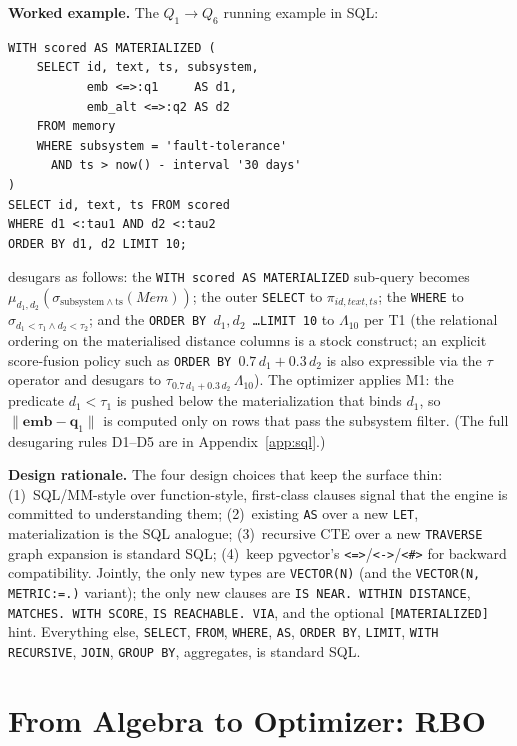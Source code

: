 \documentclass[sigconf]{acmart}
\theoremstyle{plain}
\theoremstyle{definition}
\newcommand{\vect}[1]{\boldsymbol{#1}}
\newcommand{\Mem}{\mathit{Mem}}
\theoremstyle{remark}
\begin{document}
\textbf{Worked example.} The $Q_1 \to Q_6$ running example in
SQL:
\begin{lstlisting}
WITH scored AS MATERIALIZED (
    SELECT id, text, ts, subsystem,
           emb <=>:q1     AS d1,
           emb_alt <=>:q2 AS d2
    FROM memory
    WHERE subsystem = 'fault-tolerance'
      AND ts > now() - interval '30 days'
)
SELECT id, text, ts FROM scored
WHERE d1 <:tau1 AND d2 <:tau2
ORDER BY d1, d2 LIMIT 10;
\end{lstlisting}
desugars as follows: the \texttt{WITH scored AS MATERIALIZED} sub-query
becomes $\mu_{d_1, d_2}(\sigma_{\mathrm{subsystem} \wedge \mathrm{ts}}(\Mem))$;
the outer \texttt{SELECT} to $\pi_{\mathit{id}, \mathit{text}, \mathit{ts}}$;
the \texttt{WHERE} to $\sigma_{d_1 < \tau_1 \wedge d_2 < \tau_2}$;
and the \texttt{ORDER BY $d_1, d_2$ \ldots LIMIT 10} to
$\Lambda_{10}$ per T1 (the relational ordering on the
materialised distance columns is a stock construct; an
explicit score-fusion policy such as
\texttt{ORDER BY $0.7\,d_1 + 0.3\,d_2$} is also expressible via
the $\tau$ operator and desugars to $\tau_{0.7\,d_1+0.3\,d_2}\,\Lambda_{10}$).
The optimizer applies M1: the predicate $d_1 < \tau_1$ is pushed
below the materialization that binds $d_1$, so
$\lVert\vect{emb}-\vect{q}_1\rVert$ is computed only on rows that
pass the subsystem filter. (The full desugaring rules D1--D5 are
in Appendix~\ref{app:sql}.)

\textbf{Design rationale.} The four design choices that keep the
surface thin: (1)~SQL/MM-style over function-style, first-class
clauses signal that the engine is committed to understanding them;
(2)~existing \texttt{AS} over a new \texttt{LET}, materialization
is the SQL analogue; (3)~recursive CTE over a new \texttt{TRAVERSE}
graph expansion is standard SQL; (4)~keep pgvector's
\texttt{<=>}/\texttt{<->}/\texttt{<\#>} for backward compatibility.
Jointly, the only new types are \texttt{VECTOR(N)} (and the
\texttt{VECTOR(N, METRIC:=.)} variant); the only new clauses
are \texttt{IS NEAR. WITHIN DISTANCE}, \texttt{MATCHES.
WITH SCORE}, \texttt{IS REACHABLE. VIA}, and the optional
\texttt{[MATERIALIZED]} hint. Everything else, \texttt{SELECT},
\texttt{FROM}, \texttt{WHERE}, \texttt{AS}, \texttt{ORDER BY},
\texttt{LIMIT}, \texttt{WITH RECURSIVE}, \texttt{JOIN},
\texttt{GROUP BY}, aggregates, is standard SQL.
\section{From Algebra to Optimizer: RBO}\label{sec:rbo}
\end{document}
